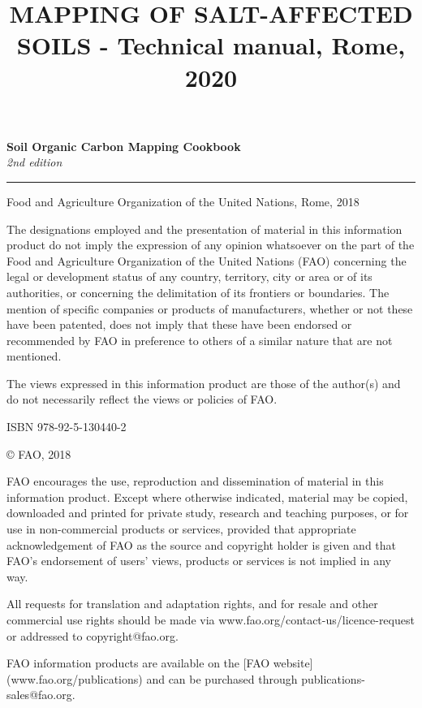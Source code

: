 \documentclass[
  10pt,
  b5paper,
]{book}
\title{MAPPING OF SALT-AFFECTED SOILS - Technical manual, Rome, 2020}
\author{}
\date{\vspace{-2.5em}}
\begin{document}
\maketitle

\pagestyle{plain}

\begin{titlepage}
    \begin{center}
        \vspace*{4cm}
        \Large

        \textcolor{astral}{\textbf{Soil Organic Carbon Mapping Cookbook\\}}
        \vspace{0.5cm}
        \normalsize
        \emph{2nd edition}
        \vfill
        \noindent
        {\color{astral}\rule{\linewidth}{0.5mm} }

        Food and Agriculture Organization of the United Nations, Rome, 2018
    \end{center}
\end{titlepage}

\clearpage
\thispagestyle{empty}

\vfill
{\footnotesize
\vspace*{4cm}
\vfill
The designations employed and the presentation of material in this information product do not imply the expression of any opinion whatsoever on the part of the Food and Agriculture Organization of the United Nations (FAO) concerning the legal or development status of any country, territory, city or area or of its authorities, or concerning the delimitation of its frontiers or boundaries. The mention of specific companies or products of manufacturers, whether or not these have been patented, does not imply that these have been endorsed or recommended by FAO in preference to others of a similar nature that are not mentioned.

The views expressed in this information product are those of the author(s) and do not necessarily reflect the views or policies of FAO.

ISBN 978-92-5-130440-2

\copyright \xspace FAO, 2018

FAO encourages the use, reproduction and dissemination of material in this information product. Except where otherwise indicated, material may be copied, downloaded and printed for private study, research and teaching purposes, or for use in non-commercial products or services, provided that appropriate acknowledgement of FAO as the source and copyright holder is given and that FAO’s endorsement of users’ views, products or services is not implied in any way.

All requests for translation and adaptation rights, and for resale and other commercial use rights should be made via www.fao.org/contact-us/licence-request or addressed to copyright@fao.org.


FAO information products are available on the [FAO website](www.fao.org/publications) and can be purchased through publications-sales@fao.org.
}
\end{document}
